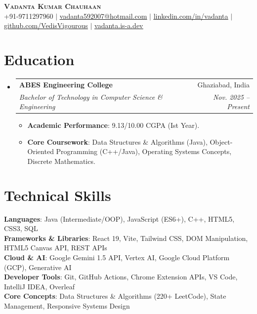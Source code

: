 \documentclass[letterpaper,11pt]{article}
\makeatletter
\newcommand{\resumeItem}[1]{
  \item\small{
    {#1 \vspace{-2pt}}
  }
}
\newcommand{\resumeSubheading}[4]{
  \vspace{-2pt}\item
    \begin{tabular*}{0.97\textwidth}[t]{l@{\extracolsep{\fill}}r}
      \textbf{#1} & #2 \\
      \textit{\small#3} & \textit{\small #4} \\
    \end{tabular*}\vspace{-7pt}
}
\newcommand{\resumeSubHeadingListStart}{\begin{itemize}[leftmargin=0.15in, label={}]}
\newcommand{\resumeSubHeadingListEnd}{\end{itemize}}
\newcommand{\resumeItemListStart}{\begin{itemize}}
\newcommand{\resumeItemListEnd}{\end{itemize}\vspace{-5pt}}
\makeatother
\begin{document}
\begin{center}
    \textbf{\Huge \scshape Vadanta Kumar Chauhaan} \\ \vspace{2pt}
    \small +91-9711297960 $|$ \href{mailto:vadanta592007@hotmail.com}{\underline{vadanta592007@hotmail.com}} $|$ 
    \href{https://linkedin.com/in/vadanta}{\underline{linkedin.com/in/vadanta}} $|$
    \href{https://github.com/VedisVigourous}{\underline{github.com/VedisVigourous}} $|$
    \href{https://vadanta.is-a.dev}{\underline{vadanta.is-a.dev}}
\end{center}

\section{Education}
  \resumeSubHeadingListStart
    \resumeSubheading
      {ABES Engineering College}{Ghaziabad, India}
      {Bachelor of Technology in Computer Science \& Engineering}{Nov. 2025 -- Present}
      \resumeItemListStart
        \resumeItem{\textbf{Academic Performance}: 9.13/10.00 CGPA (Ist Year).}
        \resumeItem{\textbf{Core Coursework}: Data Structures \& Algorithms (Java), Object-Oriented Programming (C++/Java), Operating Systems Concepts, Discrete Mathematics.}
      \resumeItemListEnd
  \resumeSubHeadingListEnd

\section{Technical Skills}
 \begin{itemize}[leftmargin=0.15in, label={}]
    \small{\item{
     \textbf{Languages}{: Java (Intermediate/OOP), JavaScript (ES6+), C++, HTML5, CSS3, SQL} \\
     \textbf{Frameworks \& Libraries}{: React 19, Vite, Tailwind CSS, DOM Manipulation, HTML5 Canvas API, REST APIs} \\
     \textbf{Cloud \& AI}{: Google Gemini 1.5 API, Vertex AI, Google Cloud Platform (GCP), Generative AI} \\
     \textbf{Developer Tools}{: Git, GitHub Actions, Chrome Extension APIs, VS Code, IntelliJ IDEA, Overleaf} \\
     \textbf{Core Concepts}{: Data Structures \& Algorithms (220+ LeetCode), State Management, Responsive Systems Design}
    }}
 \end{itemize}
\end{document}
